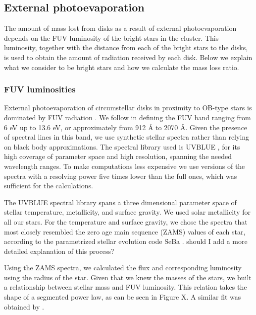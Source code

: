 \documentclass[fleqn,usenatbib]{mnras}
\newcommand\note[1]{{\colorbox{yellow!60}{\color{magenta}#1}}}
\begin{document}
\subsection{External photoevaporation}\label{photoevaporation}
The amount of mass lost from disks as a result of external photoevaporation depends on the FUV luminosity of the bright stars in the cluster. This luminosity, together with the distance from each of the bright stars to the disks, is used to obtain the amount of radiation received by each disk. Below we explain what we consider to be bright stars and how we calculate the mass loss ratio.


\subsubsection{FUV luminosities}\label{FUVluminosities}
External photoevaporation of circumstellar disks in proximity to OB-type stars is dominated by FUV radiation \citep{guarcello2016,storzer1999,gorti2016a}. We follow \citet{adams2004} in defining the FUV band ranging from 6 eV up to 13.6 eV, or approximately from 912 Å to 2070 Å. Given the presence of spectral lines in this band, we use synthetic stellar spectra rather than relying on black body approximations. The spectral library used is UVBLUE \citep{rodriguez-merino2005}, for its high coverage of parameter space and high resolution, spanning the needed wavelength ranges. To make computations less expensive we use versions of the spectra with a resolving power five times lower than the full ones, which was sufficient for the calculations. 

The UVBLUE spectral library spans a three dimensional parameter space of stellar temperature, metallicity, and surface gravity. We used solar metallicity for all our stars. For the temperature and surface gravity, we chose the spectra that most closely resembled the zero age main sequence (ZAMS) values of each star, according to the parametrized stellar evolution code SeBa \citep{portegieszwart1996, toonen2012}. \note{should I add a more detailed explanation of this process?}

Using the ZAMS spectra, we calculated the flux and corresponding luminosity using the radius of the star. Given that we knew the masses of the stars, we built a relationship between stellar mass and FUV luminosity. This relation takes the shape of a segmented power law, as can be seen in Figure X. A similar fit was obtained by \citet{parravano2003}.
\end{document}
